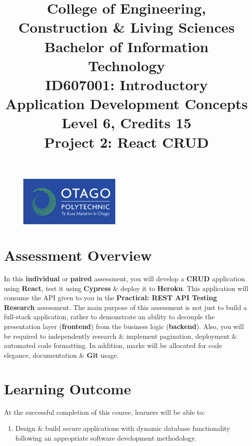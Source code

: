 \documentclass{article}
\author{}
\begin{document}
\begin{figure}
	\centering
	\includegraphics[width=50mm]{../img/logo.png}
\end{figure}

\title{College of Engineering, Construction \& Living Sciences\\Bachelor of Information Technology\\ID607001: Introductory Application Development Concepts\\Level 6, Credits 15\\\textbf{Project 2: React CRUD}}
\date{}
\maketitle

\section*{Assessment Overview}
In this \textbf{individual} or \textbf{paired} assessment, you will develop a \textbf{CRUD} application using \textbf{React}, test it using \textbf{Cypress} \& deploy it to \textbf{Heroku}. This application will consume the API given to you in the \textbf{Practical: REST API Testing Research} assessment. The main purpose of this assessment is not just to build a full-stack application, rather to demonstrate an ability to decouple the presentation layer (\textbf{frontend}) from the business logic (\textbf{backend}). Also, you will be required to independently research \& implement pagination, deployment \& automated code formatting. In addition, marks will be allocated for code elegance, documentation \& \textbf{Git} usage.

\section*{Learning Outcome}
At the successful completion of this course, learners will be able to:
\begin{enumerate}
	\item Design \& build secure applications with dynamic database functionality following an appropriate software development methodology.
\end{enumerate}
\end{document}
